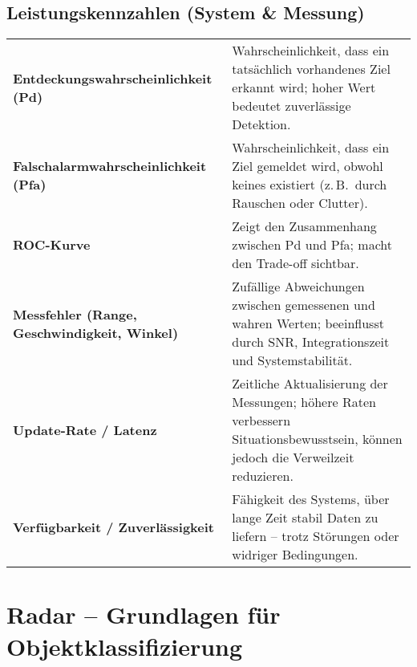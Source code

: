 \subsection{Leistungskennzahlen (System \& Messung)}
\begin{tabular}{p{} p{}}
\textbf{Entdeckungswahrscheinlichkeit (Pd)} & Wahrscheinlichkeit, dass ein tatsächlich vorhandenes Ziel erkannt wird; hoher Wert bedeutet zuverlässige Detektion. \\[0.5em]
\textbf{Falschalarmwahrscheinlichkeit (Pfa)} & Wahrscheinlichkeit, dass ein Ziel gemeldet wird, obwohl keines existiert (z.\,B.\ durch Rauschen oder Clutter). \\[0.5em]
\textbf{ROC-Kurve} & Zeigt den Zusammenhang zwischen Pd und Pfa; macht den Trade-off sichtbar. \\[0.5em]
\textbf{Messfehler (Range, Geschwindigkeit, Winkel)} & Zufällige Abweichungen zwischen gemessenen und wahren Werten; beeinflusst durch SNR, Integrationszeit und Systemstabilität. \\[0.5em]
\textbf{Update-Rate / Latenz} & Zeitliche Aktualisierung der Messungen; höhere Raten verbessern Situationsbewusstsein, können jedoch die Verweilzeit reduzieren. \\[0.5em]
\textbf{Verfügbarkeit / Zuverlässigkeit} & Fähigkeit des Systems, über lange Zeit stabil Daten zu liefern – trotz Störungen oder widriger Bedingungen. \\
\end{tabular}


\section{Radar – Grundlagen für Objektklassifizierung}

